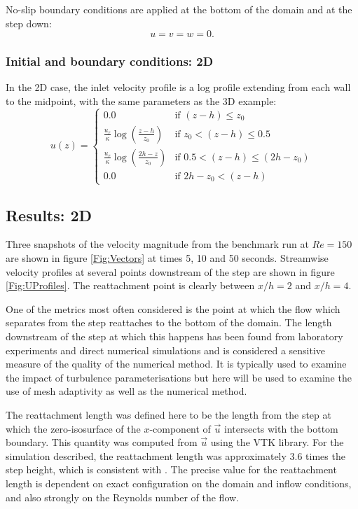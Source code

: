 No-slip boundary conditions are applied at the bottom of the domain and at the step down:
\begin{equation*}
u=v=w=0.
\end{equation*}

\subsubsection{Initial and boundary conditions: 2D}
In the 2D case, the inlet velocity profile is a log profile extending from each wall to the midpoint, with the same parameters as the 3D example:
\begin{equation*}
u(z) =
  \begin{cases}
    0.0 & \text{if } (z-h) \leq z_0 \\
    \frac{u_{\tau}}{\kappa} \log \left(\frac{z - h}{z_0}\right) & \text{if } z_0 < (z-h) \leq 0.5 \\
    \frac{u_{\tau}}{\kappa} \log \left(\frac{2h - z}{z_0}\right) & \text{if } 0.5 < (z-h) \leq (2h-z_0) \\
    0.0 & \text{if } 2h-z_0 < (z-h)
  \end{cases}
\end{equation*}


\subsection{Results: 2D}
Three snapshots of the velocity magnitude from the benchmark run at $Re=150$
are shown in figure \ref{Fig:Vectors} at times 5, 10 and 50 seconds.
Streamwise velocity profiles at several points downstream of the step are shown
in figure \ref{Fig:UProfiles}. The reattachment point is clearly between $x/h=2$ and $x/h=4$.

One of the metrics most often considered is the point at which the flow which separates from the step
reattaches to the bottom of the domain. The length downstream of the step at which this happens
has been found from laboratory experiments and direct numerical simulations and is considered a
sensitive measure of the quality of the numerical method. It is typically used to examine the impact
of turbulence parameterisations but here will be used to examine the use of mesh adaptivity
as well as the numerical method.

The reattachment length was defined here to be the length
from the step at which the zero-isosurface of the $x$-component of $\vec{u}$ intersects with
the bottom boundary. This quantity was computed from $\vec{u}$
using the VTK library. For the simulation described, the reattachment
length was approximately 3.6 times the step height, which is consistent with \cite{armaly1983}.
The precise value for the reattachment length is dependent on exact configuration on the domain and inflow
conditions, and also strongly on the Reynolds number of the flow.

